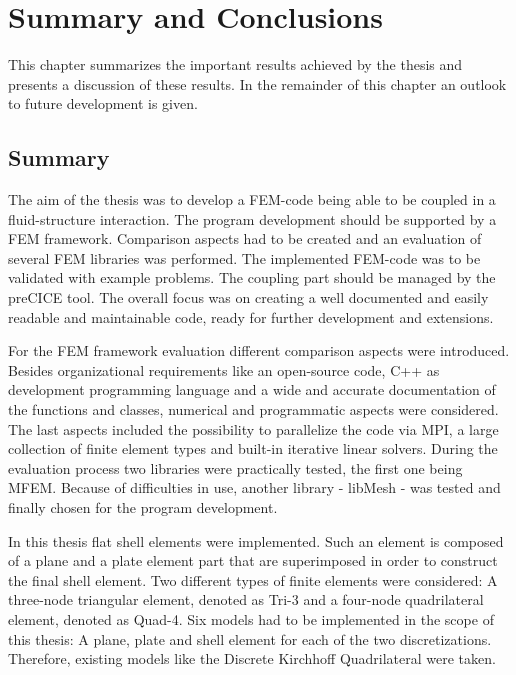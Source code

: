 \section{Summary and Conclusions}
 This chapter summarizes the important results achieved by the thesis and presents a discussion of these results. In the remainder of this chapter an outlook to future development is given.
 
 
 \subsection{Summary}
  The aim of the thesis was to develop a FEM-code being able to be coupled in a fluid-structure interaction. The program development should be supported by a FEM framework. Comparison aspects had to be created and an evaluation of several FEM libraries was performed. The implemented FEM-code was to be validated with example problems. The coupling part should be managed by the preCICE tool. The overall focus was on creating a well documented and easily readable and maintainable code, ready for further development and extensions.
  
  For the FEM framework evaluation different comparison aspects were introduced. Besides organizational requirements like an open-source code, C++ as development programming language and a wide and accurate documentation of the functions and classes, numerical and programmatic aspects were considered. The last aspects included the possibility to parallelize the code via MPI, a large collection of finite element types and built-in iterative linear solvers. During the evaluation process two libraries were practically tested, the first one being MFEM. Because of difficulties in use, another library - libMesh - was tested and finally chosen for the program development.
  
  In this thesis flat shell elements were implemented. Such an element is composed of a plane and a plate element part that are superimposed in order to construct the final shell element. Two different types of finite elements were considered: A three-node triangular element, denoted as Tri-3 and a four-node quadrilateral element, denoted as Quad-4. Six models had to be implemented in the scope of this thesis: A plane, plate and shell element for each of the two discretizations. Therefore, existing models like the Discrete Kirchhoff Quadrilateral were taken.
  
  
